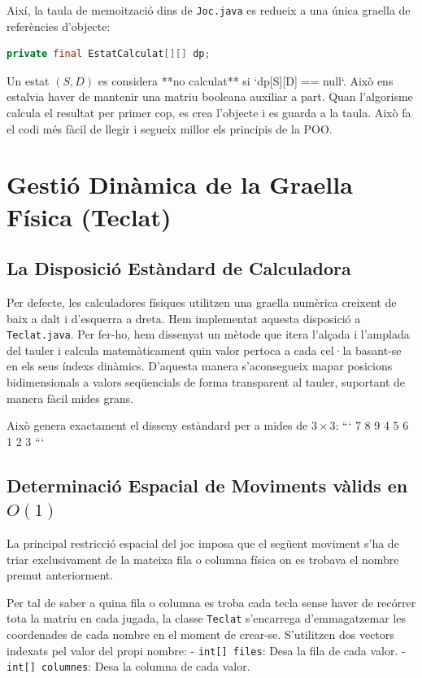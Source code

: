 \documentclass[compsoc, a4paper]{IEEEtran}
\begin{document}
Així, la taula de memoització dins de \texttt{Joc.java} es redueix a una única graella de referències d'objecte:
\begin{lstlisting}[language=Java, basicstyle=\tiny\ttfamily]
private final EstatCalculat[][] dp;
\end{lstlisting}

Un estat $(S, D)$ es considera **no calculat** si `dp[S][D] == null`. Això ens estalvia haver de mantenir una matriu booleana auxiliar a part. Quan l'algorisme calcula el resultat per primer cop, es crea l'objecte i es guarda a la taula. Això fa el codi més fàcil de llegir i segueix millor els principis de la POO.

\section{Gestió Dinàmica de la Graella Física (Teclat)}

\subsection{La Disposició Estàndard de Calculadora}

Per defecte, les calculadores físiques utilitzen una graella numèrica creixent de baix a dalt i d'esquerra a dreta. Hem implementat aquesta disposició a \texttt{Teclat.java}. Per fer-ho, hem dissenyat un mètode que itera l'alçada i l'amplada del tauler i calcula matemàticament quin valor pertoca a cada cel·la basant-se en els seus índexs dinàmics. D'aquesta manera s'aconsegueix mapar posicions bidimensionals a valors seqüencials de forma transparent al tauler, suportant de manera fàcil mides grans.

Això genera exactament el disseny estàndard per a mides de $3 \times 3$:
```
7  8  9
4  5  6
1  2  3
```

\subsection{Determinació Espacial de Moviments vàlids en $O(1)$}

La principal restricció espacial del joc imposa que el següent moviment s'ha de triar exclusivament de la mateixa fila o columna física on es trobava el nombre premut anteriorment. 

Per tal de saber a quina fila o columna es troba cada tecla sense haver de recórrer tota la matriu en cada jugada, la classe \texttt{Teclat} s'encarrega d'emmagatzemar les coordenades de cada nombre en el moment de crear-se. S'utilitzen dos vectors indexats pel valor del propi nombre:
- \texttt{int[] files}: Desa la fila de cada valor.
- \texttt{int[] columnes}: Desa la columna de cada valor.
\end{document}
